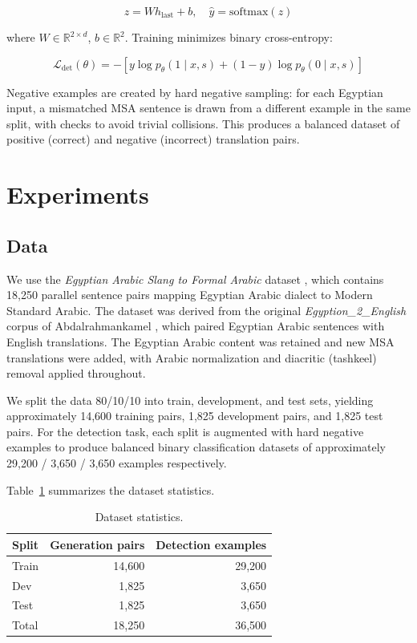 \documentclass[11pt]{article}
\begin{document}
\begin{equation}
z = W h_{\text{last}} + b, \quad \hat{y} = \text{softmax}(z)
\end{equation}

where $W \in \mathbb{R}^{2 \times d}$, $b \in \mathbb{R}^2$. Training minimizes binary cross-entropy:

\begin{equation}
\mathcal{L}_{\text{det}}(\theta) = -\left[ y \log p_\theta(1 \mid x, s) + (1-y) \log p_\theta(0 \mid x, s) \right]
\end{equation}

Negative examples are created by hard negative sampling: for each Egyptian input, a mismatched MSA sentence is drawn from a different example in the same split, with checks to avoid trivial collisions. This produces a balanced dataset of positive (correct) and negative (incorrect) translation pairs.

\section{Experiments}

\subsection{Data}

We use the \textit{Egyptian Arabic Slang to Formal Arabic} dataset \cite{ashraf2026}, which contains 18,250 parallel sentence pairs mapping Egyptian Arabic dialect to Modern Standard Arabic. The dataset was derived from the original \textit{Egyption\_2\_English} corpus of Abdalrahmankamel \cite{abdalrahman2024}, which paired Egyptian Arabic sentences with English translations. The Egyptian Arabic content was retained and new MSA translations were added, with Arabic normalization and diacritic (tashkeel) removal applied throughout.

We split the data 80/10/10 into train, development, and test sets, yielding approximately 14,600 training pairs, 1,825 development pairs, and 1,825 test pairs. For the detection task, each split is augmented with hard negative examples to produce balanced binary classification datasets of approximately 29,200 / 3,650 / 3,650 examples respectively.

Table~\ref{tab:data} summarizes the dataset statistics.

\begin{table}[H]
\centering
\caption{Dataset statistics.}
\label{tab:data}
\begin{tabular}{lrr}
\toprule
\textbf{Split} & \textbf{Generation pairs} & \textbf{Detection examples} \\
\midrule
Train & 14,600 & 29,200 \\
Dev   & 1,825  & 3,650  \\
Test  & 1,825  & 3,650  \\
\midrule
Total & 18,250 & 36,500 \\
\bottomrule
\end{tabular}
\end{table}
\end{document}

